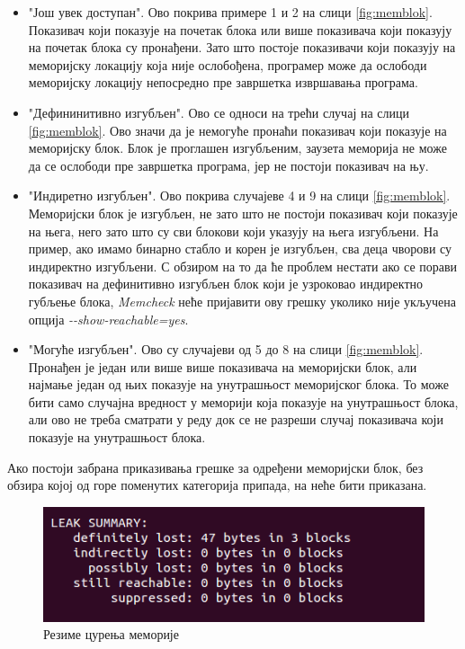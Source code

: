 \documentclass[12pt,oneside]{memoir}
\begin{document}
\begin{itemize}
  \item "Још увек доступан". Ово покрива примере 1 и 2 на слици \ref{fig:memblok}. Показивач који показује на почетак блока или више показивача који показују на почетак блока су пронађени. Зато што постоје показивачи који показују на меморијску локацију која није ослобођена, програмер може да ослободи меморијску локацију непосредно пре завршетка извршавања програма.
  \item "Дефининитивно изгубљен". Ово се односи на трећи случај на слици \ref{fig:memblok}. Ово значи да је немогуће пронаћи показивач који показује на меморијску блок. Блок је проглашен изгубљеним, заузета меморија не може да се ослободи пре завршетка програма, јер не постоји показивач на њу.
  \item "Индиретно изгубљен". Ово покрива случајеве 4 и 9 на слици \ref{fig:memblok}. Меморијски блок је изгубљен, не зато што не постоји показивач који показује на њега, него зато што су сви блокови који указују на њега изгубљени. На пример, ако имамо бинарно стабло и корен је изгубљен, сва деца чворови су индиректно изгубљени. С обзиром на то да ће проблем нестати ако се порави показивач на дефинитивно изгубљен блок који је узроковао индиректно губљење блока, \textit{Memcheck} неће пријавити ову грешку уколико није укључена опција \textit{-\--show-reachable=yes}.
  \item "Могуће изгубљен". Ово су случајеви од 5 до 8 на слици \ref{fig:memblok}. Пронађен је један или више више показивача на меморијски блок,  али најмање један од њих показује на унутрашњост меморијског блока. То може бити само случајна вредност у меморији која показује на унутрашњост блока, али ово не треба сматрати у реду док се не разреши случај показивача који показује на унутрашњост блока.
\end{itemize}

\indent Ако постоји забрана приказивања грешке за одређени меморијски блок, без обзира којој од горе поменутих категорија припада, на неће бити приказана.

\begin{figure}[h!]
\begin{center}
\includegraphics[scale=0.75]{slika8.png}
\end{center}
\caption{Резиме цурења меморије}
\label{fig:memcurenje}
\end{figure}
\end{document}
